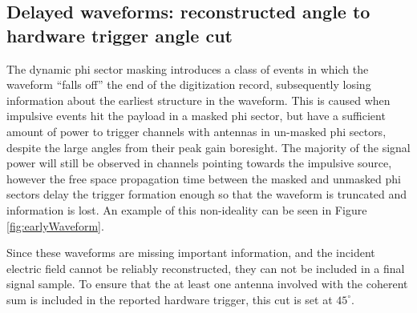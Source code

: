 	
	\subsection{Delayed waveforms: reconstructed angle to hardware trigger angle cut}
		The dynamic phi sector masking introduces a class of events in which the waveform ``falls off'' the end of the digitization record, subsequently losing information about the earliest structure in the waveform.  This is caused when impulsive events hit the payload in a masked phi sector, but have a sufficient amount of power to trigger channels with antennas in un-masked phi sectors, despite the large angles from their peak gain boresight.  The majority of the signal power will still be observed in channels pointing towards the impulsive source, however the free space propagation time between the masked and unmasked phi sectors delay the trigger formation enough so that the waveform is truncated and information is lost.  An example of this non-ideality can be seen in Figure \ref{fig:earlyWaveform}.
		
		Since these waveforms are missing important information, and the incident electric field cannot be reliably reconstructed, they can not be included in a final signal sample.  To ensure that the at least one antenna involved with the coherent sum is included in the reported hardware trigger, this cut is set at $45^\circ$.
		
